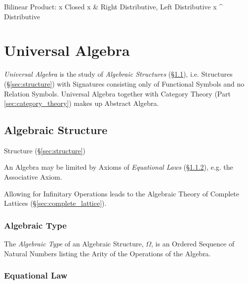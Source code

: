             Bilinear
            Product:
                      x Closed
                    x & Right Distributive, Left Distributive
                    x ^ Distributive


\fi


\section{Universal Algebra}\label{sec:universal_algebra}

\emph{Universal Algebra} is the study of \emph{Algebraic Structures}
(\S\ref{sec:algebraic_structure}), i.e. Structures
(\S\ref{sec:structure}) with Signatures consisting only of Functional
Symbols and no Relation Symbols. Universal Algebra together with
Category Theory (Part \ref{sec:category_theory}) makes up Abstract
Algebra.



\subsection{Algebraic Structure}\label{sec:algebraic_structure}

Structure (\S\ref{sec:structure})

An Algebra may be limited by Axioms of \emph{Equational Laws}
(\S\ref{sec:equational_law}), e.g. the Associative Axiom.

Allowing for Infinitary Operations leads to the Algebraic Theory of
Complete Lattices (\S\ref{sec:complete_lattice}).



\subsubsection{Algebraic Type}\label{sec:algebraic_type}

The \emph{Algebraic Type} of an Algebraic Structure, $\Omega$, is an
Ordered Sequence of Natural Numbers listing the Arity of the
Operations of the Algebra.



\subsubsection{Equational Law}\label{sec:equational_law}

